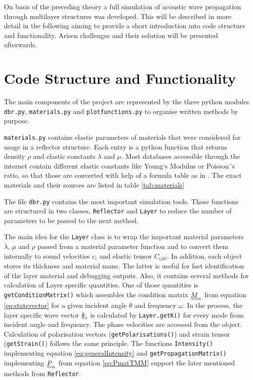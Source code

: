 On basis of the preceding theory a full simulation of acoustic wave propagation
through multilayer structures was developed. This will be
described in more detail in the following aiming to provide a short
introduction into code structure and functionality. Arisen challenges and their
solution will be presented afterwards.

\section{Code Structure and Functionality}
The main components of the project are represented by the three python modules
\texttt{dbr.py}, \texttt{materials.py} and \texttt{plotfunctions.py} to
organise written methods by purpose.

\texttt{materials.py} contains elastic parameters of materials that were
considered for usage in a reflector structure. Each entry is a python function
that returns density $\rho$ and elastic constants $\lambda$ and $\mu$. Most
databases accessible through the internet contain different elastic constants
like Young`s Modulus or Poisson´s ratio, so that those are converted with help
of a formula table as in \cite[30]{kundu2012ultrasonic}.
The exact materials and their sources are listed in table \ref{tab:materials}


The file \texttt{dbr.py} contains the most important simulation tools. Those
functions are structured in two classes, \texttt{Reflector} and \texttt{Layer}
to reduce the number of parameters to be passed to the next method.

The main idea for the \texttt{Layer} class is to wrap the important material
parameters $\lambda$, $\mu$ and $\rho$ passed from a material parameter
function and to convert them internally to sound velocities $c_i$ and elastic
tensor $C_{ijkl}$. In addition, each object stores its thickness and material
name. The latter is useful for fast identification of the layer material and
debugging outputs.
Also, it contains several methods for calculation of Layer specific
quantities. One of those quantities is \texttt{getConditionMatrix()} which
assembles the condition matrix $\underline{\underline{M}}_n$ from equation
\ref{eq:statevector} for a given incident angle
$\theta$ and frequency $\omega$. In the process, the layer specific wave vector
$\underline{k}_i$ is calculated by \texttt{Layer.getK()} for every mode from
incident angle and frequency. The phase velocities are accessed from the
object. Calculation of polarisation vectors (\texttt{getPolarisations()}) and
strain tensor (\texttt{getStrain()}) follows the same principle. The functions
\texttt{Intensity()} implementing equation \ref{eq:generalIntensity} and
\texttt{getPropagationMatrix()} implementing $\underline{\underline{P}}_n$ from equation
\ref{eq:PmatTMM} support the later mentioned methods from
\texttt{Reflector}.

